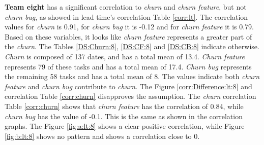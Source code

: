 \documentclass[UKenglish]{ifimaster}  %
\begin{document}
\textbf{Team eight} has a significant correlation to \textit{churn} and \textit{churn feature}, but not \textit{churn bug}, as showed in lead time's correlation Table  \ref{corr:lt}. The correlation values for \textit{churn} is 0.91, for \textit{churn bug} it is  -0.12 and for \textit{churn feature} it is 0.79. Based on these variables, it looks like \textit{churn feature} represents a greater part of the \textit{churn}. The Tables \ref{DS:Churn:8}, \ref{DS:CF:8} and \ref{DS:CB:8} indicate otherwise. \textit{Churn} is composed of 137 dates, and has a total mean of 13.4. \textit{Churn feature} represents 79 of these tasks and has a total mean of 17.4. \textit{Churn bug} represents the remaining 58 tasks and has a total mean of 8.  The values indicate both \textit{churn feature} and \textit{churn bug} contribute to \textit{churn}. The Figure \ref{corr:Difference:lt:8} and correlation Table \ref{corr:churn} disapproves the assumption. The \textit{churn} correlation Table \ref{corr:churn} shows that \textit{churn feature} has the correlation of 0.84, while \textit{churn bug} has the value of -0.1. This is the same as shown in the correlation graphs. The Figure \ref{fig:a:lt:8} shows a clear positive correlation, while Figure \ref{fig:b:lt:8} shows no pattern and shows a correlation close to 0. 
\end{document}

